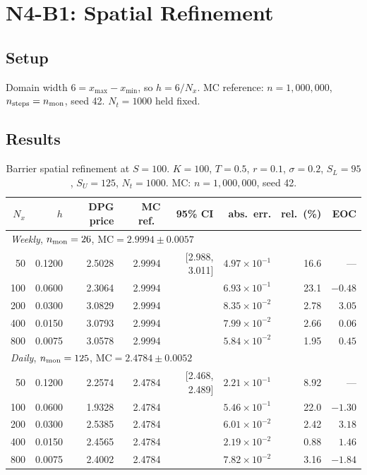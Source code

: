 \documentclass[11pt,a4paper]{article}
\newcommand{\Nx}{N_x}
\newcommand{\Nt}{N_t}
\newcommand{\SL}{S_L}
\newcommand{\SU}{S_U}
\begin{document}
\section{N4-B1: Spatial Refinement}
\label{sec:spatial}

\subsection{Setup}

Domain width $6 = x_{\max} - x_{\min}$, so $h = 6/\Nx$.
MC reference: $n = 1{,}000{,}000$, $n_{\rm steps} = n_{\rm mon}$,
seed 42.  $\Nt = 1000$ held fixed.

\subsection{Results}

\begin{table}[htbp]
\centering
\caption{Barrier spatial refinement at $S = 100$.
         $K=100$, $T=0.5$, $r=0.1$, $\sigma=0.2$,
         $\SL=95$, $\SU=125$, $\Nt=1000$.
         MC: $n=1{,}000{,}000$, seed 42.}
\label{tab:spatial}
\small
\begin{tabular}{rrrrrrrr}
\toprule
$\Nx$ & $h$ & DPG price & MC ref.\ & 95\% CI & abs.\ err. & rel.\ (\%) & EOC \\
\midrule
\multicolumn{8}{l}{\emph{Weekly}, $n_{\rm mon}=26$,
  MC$= 2.9994 \pm 0.0057$} \\
\midrule
   50 & 0.1200 & 2.5028 & 2.9994 & [2.988, 3.011] & $4.97\times10^{-1}$ & 16.6 & --- \\
  100 & 0.0600 & 2.3064 & 2.9994 &                & $6.93\times10^{-1}$ & 23.1 & $-0.48$ \\
  200 & 0.0300 & 3.0829 & 2.9994 &                & $8.35\times10^{-2}$ &  2.78 & $3.05$ \\
  400 & 0.0150 & 3.0793 & 2.9994 &                & $7.99\times10^{-2}$ &  2.66 & $0.06$ \\
  800 & 0.0075 & 3.0578 & 2.9994 &                & $5.84\times10^{-2}$ &  1.95 & $0.45$ \\
\midrule
\multicolumn{8}{l}{\emph{Daily}, $n_{\rm mon}=125$,
  MC$= 2.4784 \pm 0.0052$} \\
\midrule
   50 & 0.1200 & 2.2574 & 2.4784 & [2.468, 2.489] & $2.21\times10^{-1}$ &  8.92 & --- \\
  100 & 0.0600 & 1.9328 & 2.4784 &                & $5.46\times10^{-1}$ & 22.0  & $-1.30$ \\
  200 & 0.0300 & 2.5385 & 2.4784 &                & $6.01\times10^{-2}$ &  2.42 & $3.18$ \\
  400 & 0.0150 & 2.4565 & 2.4784 &                & $2.19\times10^{-2}$ &  0.88 & $1.46$ \\
  800 & 0.0075 & 2.4002 & 2.4784 &                & $7.82\times10^{-2}$ &  3.16 & $-1.84$ \\
\bottomrule
\end{tabular}
\end{table}
\end{document}
